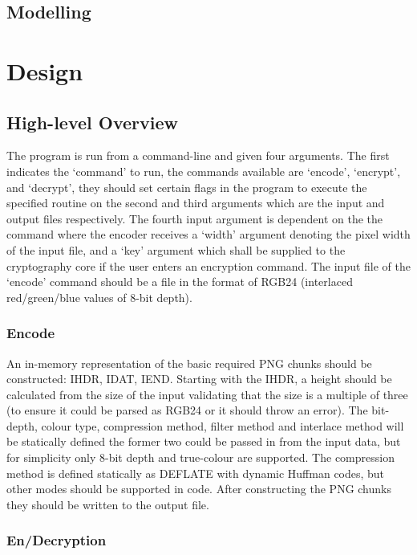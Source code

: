\documentclass{report}
\begin{document}
\section{Modelling}

\chapter{Design}

\section{High-level Overview}

The program is run from a command-line and given four arguments. The first indicates the `command' to run, the commands available are `encode', `encrypt', and `decrypt', they should set certain flags in the program to execute the specified routine on the second and third arguments which are the input and output files respectively. The fourth input argument is dependent on the the command where the encoder receives a `width' argument denoting the pixel width of the input file, and a `key' argument which shall be supplied to the cryptography core if the user enters an encryption command.
The input file of the `encode' command should be a file in the format of RGB24 (interlaced red/green/blue values of 8-bit depth).

\subsection{Encode}

An in-memory representation of the basic required PNG chunks should be constructed: IHDR, IDAT, IEND. Starting with the IHDR, a height should be calculated from the size of the input validating that the size is a multiple of three (to ensure it could be parsed as RGB24 or it should throw an error). The bit-depth, colour type, compression method, filter method and interlace method will be statically defined the former two could be passed in from the input data, but for simplicity only 8-bit depth and true-colour are supported. The compression method is defined statically as DEFLATE with dynamic Huffman codes, but other modes should be supported in code. After constructing the PNG chunks they should be written to the output file.

\subsection{En/Decryption}
\end{document}
